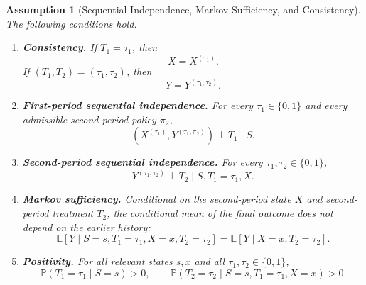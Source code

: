\documentclass[12pt]{article}
\newtheorem{assumption}[theorem]{Assumption}
\newcommand{\1}{\mathbf{1}}
\begin{document}
\begin{assumption}[Sequential Independence, Markov Sufficiency, and Consistency]
\label{ass:sequential_independence_markov}
The following conditions hold.
\begin{enumerate}
    \item \textbf{Consistency.} If $T_1=\tau_1$, then
    \[
    X=X^{(\tau_1)}.
    \]
    If $(T_1,T_2)=(\tau_1,\tau_2)$, then
    \[
    Y=Y^{(\tau_1,\tau_2)}.
    \]

    \item \textbf{First-period sequential independence.} For every
    $\tau_1\in\{0,1\}$ and every admissible second-period policy $\pi_2$,
    \[
    \left(X^{(\tau_1)},Y^{(\tau_1,\pi_2)}\right)
    \perp T_1\mid S.
    \]

    \item \textbf{Second-period sequential independence.} For every
    $\tau_1,\tau_2\in\{0,1\}$,
    \[
    Y^{(\tau_1,\tau_2)}\perp T_2
    \mid S,T_1=\tau_1,X.
    \]

    \item \textbf{Markov sufficiency.} Conditional on the second-period
    state $X$ and second-period treatment $T_2$, the conditional mean of the
    final outcome does not depend on the earlier history:
    \[
    \mathbb E[Y\mid S=s,T_1=\tau_1,X=x,T_2=\tau_2]
    =
    \mathbb E[Y\mid X=x,T_2=\tau_2].
    \]

    \item \textbf{Positivity.} For all relevant states $s,x$ and all
    $\tau_1,\tau_2\in\{0,1\}$,
    \[
    \mathbb P(T_1=\tau_1\mid S=s)>0,
    \qquad
    \mathbb P(T_2=\tau_2\mid S=s,T_1=\tau_1,X=x)>0.
    \]
\end{enumerate}
\end{assumption}
\end{document}
